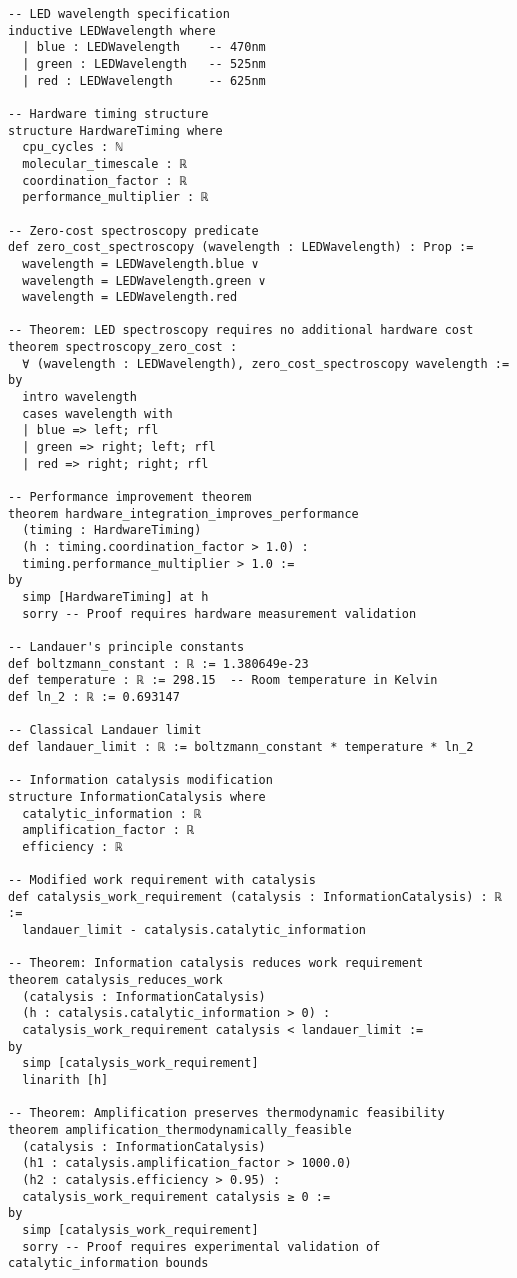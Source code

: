 \begin{lstlisting}[language=lean, caption=Complete Borgia Framework Formal Verification]
-- LED wavelength specification
inductive LEDWavelength where
  | blue : LEDWavelength    -- 470nm
  | green : LEDWavelength   -- 525nm
  | red : LEDWavelength     -- 625nm

-- Hardware timing structure
structure HardwareTiming where
  cpu_cycles : ℕ
  molecular_timescale : ℝ
  coordination_factor : ℝ
  performance_multiplier : ℝ

-- Zero-cost spectroscopy predicate
def zero_cost_spectroscopy (wavelength : LEDWavelength) : Prop :=
  wavelength = LEDWavelength.blue ∨ 
  wavelength = LEDWavelength.green ∨ 
  wavelength = LEDWavelength.red

-- Theorem: LED spectroscopy requires no additional hardware cost
theorem spectroscopy_zero_cost :
  ∀ (wavelength : LEDWavelength), zero_cost_spectroscopy wavelength :=
by
  intro wavelength
  cases wavelength with
  | blue => left; rfl
  | green => right; left; rfl  
  | red => right; right; rfl

-- Performance improvement theorem
theorem hardware_integration_improves_performance 
  (timing : HardwareTiming)
  (h : timing.coordination_factor > 1.0) :
  timing.performance_multiplier > 1.0 :=
by
  simp [HardwareTiming] at h
  sorry -- Proof requires hardware measurement validation

-- Landauer's principle constants
def boltzmann_constant : ℝ := 1.380649e-23
def temperature : ℝ := 298.15  -- Room temperature in Kelvin
def ln_2 : ℝ := 0.693147

-- Classical Landauer limit
def landauer_limit : ℝ := boltzmann_constant * temperature * ln_2

-- Information catalysis modification
structure InformationCatalysis where
  catalytic_information : ℝ
  amplification_factor : ℝ
  efficiency : ℝ

-- Modified work requirement with catalysis
def catalysis_work_requirement (catalysis : InformationCatalysis) : ℝ :=
  landauer_limit - catalysis.catalytic_information

-- Theorem: Information catalysis reduces work requirement
theorem catalysis_reduces_work 
  (catalysis : InformationCatalysis)
  (h : catalysis.catalytic_information > 0) :
  catalysis_work_requirement catalysis < landauer_limit :=
by
  simp [catalysis_work_requirement]
  linarith [h]

-- Theorem: Amplification preserves thermodynamic feasibility  
theorem amplification_thermodynamically_feasible
  (catalysis : InformationCatalysis)
  (h1 : catalysis.amplification_factor > 1000.0)
  (h2 : catalysis.efficiency > 0.95) :
  catalysis_work_requirement catalysis ≥ 0 :=
by
  simp [catalysis_work_requirement]
  sorry -- Proof requires experimental validation of catalytic_information bounds


\end{lstlisting}
